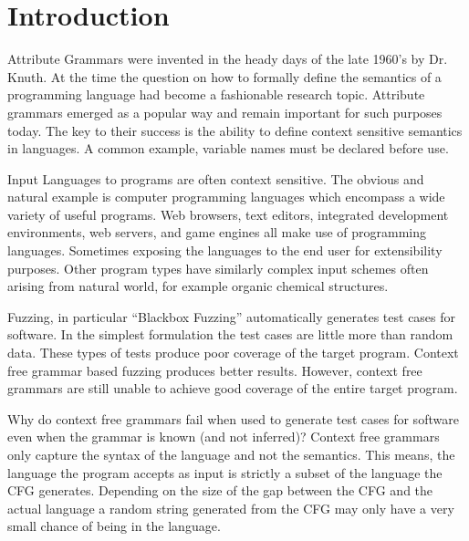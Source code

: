 
\section{Introduction}

Attribute Grammars were invented in the heady days of the late 1960's by Dr.
Knuth.\cite{Knuth1990} At the time the question on how to formally define the
semantics of a programming language had become a fashionable research topic.
Attribute grammars emerged as a popular way and remain important for such
purposes today. The key to their success is the ability to define context
sensitive semantics in languages. A common example, variable names must be
declared before use.

Input Languages to programs are often context sensitive. The obvious and natural
example is computer programming languages which encompass a wide variety of
useful programs. Web browsers, text editors, integrated development
environments, web servers, and game engines all make use of programming
languages. Sometimes exposing the languages to the end user for extensibility
purposes. Other program types have similarly complex input schemes often arising
from natural world, for example organic chemical structures.

Fuzzing, in particular ``Blackbox Fuzzing'' automatically generates test cases
for software. In the simplest formulation the test cases are little more than
random data. These types of tests produce poor coverage of the target program.
Context free grammar based fuzzing produces better results. However, context
free grammars are still unable to achieve good coverage of the entire target
program. 

Why do context free grammars fail when used to generate test cases for software
even when the grammar is known (and not inferred)? Context free grammars only
capture the syntax of the language and not the semantics. This means, the
language the program accepts as input is strictly a subset of the language the
CFG generates. Depending on the size of the gap between the CFG and the actual
language a random string generated from the CFG may only have a very small
chance of being in the language.

